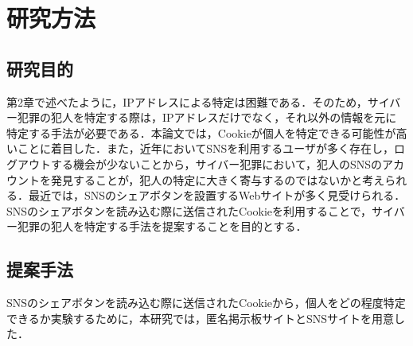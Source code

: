 \documentclass[10pt, a4paper]{jreport}
\begin{document}
\newpage
















\chapter{研究方法}
\section{研究目的}

第2章で述べたように，IPアドレスによる特定は困難である．そのため，サイバー犯罪の犯人を特定する際は，IPアドレスだけでなく，それ以外の情報を元に特定する手法が必要である．本論文では，Cookieが個人を特定できる可能性が高いことに着目した．また，近年においてSNSを利用するユーザが多く存在し，ログアウトする機会が少ないことから，サイバー犯罪において，犯人のSNSのアカウントを発見することが，犯人の特定に大きく寄与するのではないかと考えられる．最近では，SNSのシェアボタンを設置するWebサイトが多く見受けられる．SNSのシェアボタンを読み込む際に送信されたCookieを利用することで，サイバー犯罪の犯人を特定する手法を提案することを目的とする．

\section{提案手法}
SNSのシェアボタンを読み込む際に送信されたCookieから，個人をどの程度特定できるか実験するために，本研究では，匿名掲示板サイトとSNSサイトを用意した．

\newpage
\end{document}
